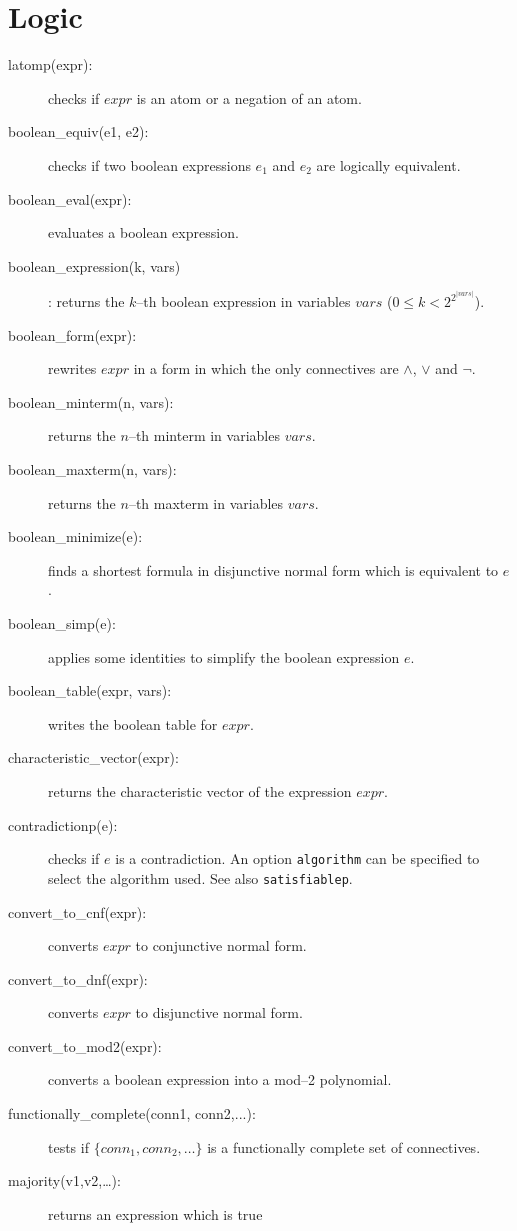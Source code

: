 \documentclass[11pt]{article}
\begin{document}
\section{Logic}
\begin{description}
  \item[latomp(expr):] checks if $expr$ is an atom or a negation of an
    atom.
  \item[boolean\_equiv(e1, e2):] checks if two boolean expressions
    $e_1$ and $e_2$ are logically equivalent.
  \item[boolean\_eval(expr):] evaluates a boolean expression.
  \item[boolean\_expression(k, vars)]: returns the $k$--th boolean
    expression in variables $vars$ ($0\leq k < 2^{2^{|vars|}}$).
  \item[boolean\_form(expr):] rewrites $expr$ in a form in which the
    only connectives are $\land$, $\lor$ and $\lnot$.
  \item[boolean\_minterm(n, vars):] returns the $n$--th minterm in
    variables $vars$.
  \item[boolean\_maxterm(n, vars):] returns the $n$--th maxterm in
    variables $vars$.
  \item[boolean\_minimize(e):] finds a shortest formula in disjunctive
    normal form which is equivalent to $e$.
  \item [boolean\_simp(e):] applies some identities to simplify the
    boolean expression $e$.
  \item[boolean\_table(expr, vars):] writes the boolean table for
    $expr$.
  \item[characteristic\_vector(expr):] returns the characteristic
    vector of the expression $expr$.
  \item[contradictionp(e):] checks if $e$ is a contradiction. An
    option \texttt{algorithm} can be specified to select the algorithm
    used. See also \texttt{satisfiablep}.
  \item[convert\_to\_cnf(expr):] converts $expr$ to conjunctive normal
    form.
  \item[convert\_to\_dnf(expr):] converts $expr$ to disjunctive normal
    form.
  \item[convert\_to\_mod2(expr):] converts a boolean expression into a
    mod--2 polynomial.
  \item[functionally\_complete(conn1, conn2,...):] tests if $\{conn_1,
    conn_2, \ldots\}$ is a functionally complete set of connectives.
  \item[majority(v1,v2,\ldots):] returns an expression which is true

\end{description}
\end{document}
